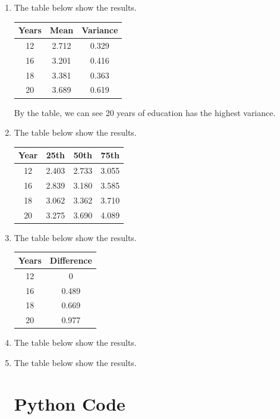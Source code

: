 \documentclass{article}
\begin{document}
\begin{enumerate}[label=\alph*)]
\item The table below show the results.

\begin{tabular}{ c c c }
 Years & Mean & Variance \\
 \hline
 12 & 2.712 & 0.329 \\ 
 16 & 3.201 & 0.416 \\ 
 18 & 3.381 & 0.363 \\ 
 20 & 3.689 & 0.619    
\end{tabular}

By the table, we can see 20 years of education has the highest variance.


\item The table below show the results.

\begin{tabular}{ c c c c }
Year & 25th & 50th & 75th \\
\hline
12 & 2.403 & 2.733 & 3.055 \\
16 & 2.839 &	3.180 & 3.585 \\
18 & 3.062 &	3.362 & 3.710 \\
20 & 3.275 &	3.690 &	4.089 \\
\end{tabular}

\item The table below show the results.

\begin{tabular}{ c c }
Years & Difference \\
\hline
12 & 0 \\
16 & 0.489 \\
18 & 0.669 \\
20 & 0.977 \\
\end{tabular}

\item  The table below show the results.



\item The table below show the results.





\section{Python Code}

\begin{lstlisting}[language=Python]


\end{lstlisting}

\end{enumerate}
\end{document}
